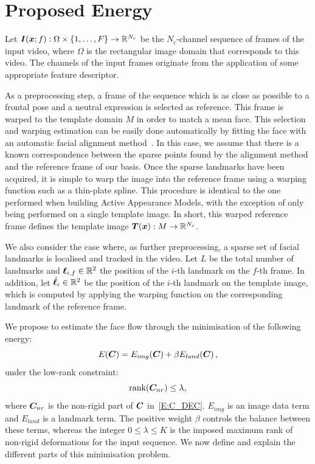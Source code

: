 \section{Proposed Energy}
Let $\boldsymbol{I}(\boldsymbol{x};f):\Omega\times \{1,\ldots,F\} \rightarrow \mathbb{R}^{N_c}$ be the
$N_c$-channel sequence of frames of the input video, where $\Omega$ is the
rectangular image domain that corresponds to this video. The channels of the
input frames originate from the application of some appropriate feature descriptor.

As a preprocessing step, a frame of the sequence which is as close as possible to
a frontal pose and a neutral expression is selected as reference. This frame is
warped to the template domain $M$ in order to match a mean face. This selection
and warping estimation can be easily done automatically by fitting the face
with an automatic facial alignment method~\cite{kazemi2014one,matthews2004active}. 
In this case, we assume that there is a known correspondence between the sparse points
found by the alignment method and the reference frame of our basis. Once the
sparse landmarks have been acquired, it is simple to warp the image into the
reference frame using a warping function such as a thin-plate spline. This
procedure is identical to the one performed when building Active Appearance
Models, with the exception of only being performed on a single template image.
In short, this warped reference frame defines the template image 
$\boldsymbol{T}(\boldsymbol{x}):M \rightarrow \mathbb{R}^{N_c}$.

We also consider the case where, as further preprocessing, a sparse set of facial
landmarks is localised and tracked in the video. Let $L$ be the total number of
landmarks and $\boldsymbol{\ell}_{i,f}\in\mathbb{R}^2$ the position of the $i$-th landmark on the
$f$-th frame. In addition, let $\hat{\boldsymbol{\ell}}_i\in\mathbb{R}^2$ be the position of the
$i$-th landmark on the template image, which is computed by applying the warping
function on the corresponding landmark of the reference frame.

We propose to estimate the face flow through the minimisation of the following energy:
\begin{equation}
    E(\boldsymbol{C}) = E_{img}(\boldsymbol{C}) + \beta E_{land}(\boldsymbol{C}) \,,
\end{equation}
under the low-rank constraint:
\begin{equation}\label{eq:lowrank}
    \mbox{rank}(\boldsymbol{C}_{nr}) \leq \lambda,
\end{equation}
where $\boldsymbol{C}_{nr}$ is the non-rigid part of $\boldsymbol{C}$ in~\cref{E:C_DEC}. 
$E_{img}$ is an image data 
term and $E_{land}$ is a landmark term. The positive weight $\beta$ 
controls the balance between these terms, whereas the integer $0\leq\lambda\leq K$ is the 
imposed maximum rank of non-rigid deformations for the input sequence. 
We now define and explain the different parts of this minimisation problem.


